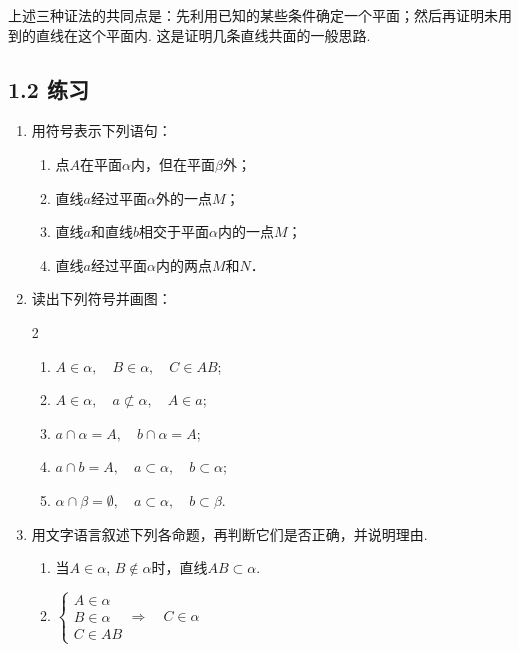\begin{remark}
    上述三种证法的共同点是：先利用已知的某些条件确定一个平面；然后再证明未用到的直线在这个平面内. 这是证明几条直线共面的一般思路.
\end{remark}

\subsection*{1.2 练习}
\begin{enumerate}
\item 用符号表示下列语句：
\begin{enumerate}[(1)]
\item 点$A$在平面$\alpha$内，但在平面$\beta$外；
\item 直线$a$经过平面$\alpha$外的一点$M$；
\item 直线$a$和直线$b$相交于平面$\alpha$内的一点$M$；
\item 直线$a$经过平面$\alpha$内的两点$M$和$N$．
\end{enumerate}

\item 读出下列符号并画图：
\begin{multicols}{2}
\begin{enumerate}[(1)]
    \item $A\in\alpha,\quad B\in\alpha,\quad  C\in AB$;
    \item $A\in\alpha,\quad a\not\subset\alpha,\quad A\in a$;
    \item $a\cap \alpha=A,\quad b\cap \alpha=A$;
    \item $a\cap b=A,\quad a\subset\alpha,\quad b\subset \alpha$;
    \item $\alpha\cap \beta =\emptyset,\quad a\subset\alpha,\quad b\subset\beta$.
\end{enumerate}    
\end{multicols}


\item 用文字语言叙述下列各命题，再判断它们是否正确，并说明理由.
\begin{enumerate}[(1)]
    \item 当$A\in\alpha$, $B\notin \alpha$时，直线$AB\subset\alpha$.
    \item $\begin{cases}
        A\in\alpha\\B\in\alpha\\C\in AB
    \end{cases}\Rightarrow\quad C\in \alpha$
\end{enumerate}   
\end{enumerate}


